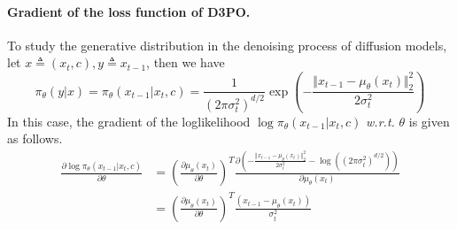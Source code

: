 \paragraph{Gradient of the loss function of D3PO.}
To study the generative distribution in the denoising process of diffusion models, let $x\triangleq (x_t,c), y\triangleq x_{t-1}$, then we have
\begin{equation}
    \pi_\theta(y|x)=\pi_\theta(x_{t-1}|x_t,c)=
\frac{1}{(2\pi\sigma_t^2)^{d/2}}\exp(-\frac{\Vert x_{t-1}-\mu_\theta(x_t)\Vert_2^2}{2\sigma_t^2})
\end{equation}
In this case, the gradient of the loglikelihood $\log \pi_\theta(x_{t-1}|x_t,c)$ \emph{w.r.t.} $\theta$ is given as follows.
\begin{equation}
\begin{aligned}
    \frac{\partial\log\pi_\theta(x_{t-1}|x_t,c)}{\partial \theta}
    & = (\frac{\partial \mu_\theta(x_t)}{\partial \theta})^T \frac{\partial (-\frac{\Vert x_{t-1}-\mu_\theta(x_t)\Vert_2^2}{2\sigma_t^2} - \log((2\pi\sigma_t^2)^{d/2}))}{\partial \mu_\theta(x_t)}  \\
    & = (\frac{\partial \mu_\theta(x_t)}{\partial \theta})^T\frac{(x_{t-1}-\mu_\theta(x_t))}{\sigma_t^2}
\end{aligned}
\end{equation}


